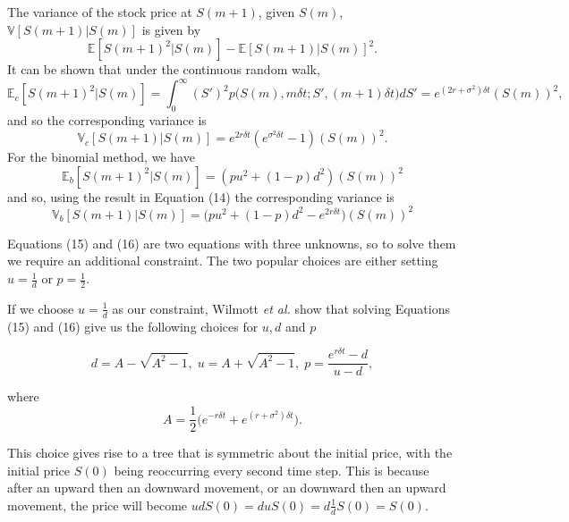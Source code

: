 \documentclass[letterpaper,12pt]{article}
\theoremstyle{plain}
\numberwithin{equation}{section}
\begin{document}
The variance of the stock price at $S(m+1)$, given $S(m)$, $\mathbb{V}[S(m+1)|S(m)]$ is given by
\begin{equation*}
 	\mathbb{E}[S(m+1)^2|S(m)]-\mathbb{E}[S(m+1)|S(m)]^2.
 \end{equation*}
It can be shown that under the continuous random walk, 
\begin{equation*}
	\mathbb{E}_c[S(m+1)^2|S(m)] = \int_0^\infty (S')^2p\bigg( S(m), m\delta t; S', (m+1)\delta t\bigg)dS' = e^{(2r+\sigma^2)\delta t}(S(m))^2,
\end{equation*}
and so the corresponding variance is
\begin{equation*}
	\mathbb{V}_c[S(m+1)|S(m)] = e^{2r\delta t}(e^{\sigma^2\delta t}-1)(S(m))^2.
\end{equation*}
For the binomial method, we have 
\begin{equation}
	\mathbb{E}_b[S(m+1)^2|S(m)] = (pu^2 + (1-p)d^2)(S(m))^2
\end{equation}
and so, using the result in Equation (14) the corresponding variance is 
\begin{equation}
	\mathbb{V}_b[S(m+1)|S(m)] =\big(pu^2 + (1-p)d^2 - e^{2r\delta t} \big)(S(m))^2
\end{equation}

Equations (15) and (16) are two equations with three unknowns, so to solve them we require an additional constraint. The two popular choices are either setting $u = \frac{1}{d} $ or $p = \frac{1}{2}$.

If we choose $u = \frac{1}{d}$ as our constraint, Wilmott {\em et al.} show that solving Equations (15) and (16) give us the following choices for $u, d$ and $p$

\begin{equation}
	d = A - \sqrt{A^2 - 1}, \;	u = A + \sqrt{A^2 - 1}, \; p = \frac{e^{r\delta t} - d}{u-d},
\end{equation}

where
\begin{equation*}
	A = \frac{1}{2}\bigg( e^{-r\delta t} + e^{(r + \sigma^2)\delta t}\bigg).
\end{equation*}

This choice gives rise to a tree that is symmetric about the initial price, with the initial price $S(0)$ being reoccurring every second time step. This is because after an upward then an downward movement, or an downward then an upward movement, the price will become $udS(0) = duS(0) = d\frac{1}{d}S(0) = S(0)$.
\end{document}
